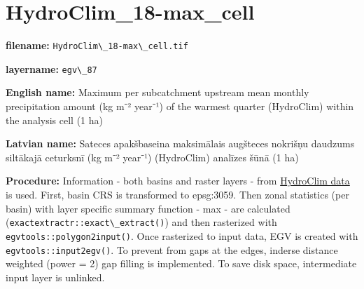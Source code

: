 \documentclass[
]{book}
\newcommand{\passthrough}[1]{#1}
\begin{document}
\section{HydroClim\_18-max\_cell}\label{ch06.087}

\textbf{filename:} \passthrough{\lstinline!HydroClim\_18-max\_cell.tif!}

\textbf{layername:} \passthrough{\lstinline!egv\_87!}

\textbf{English name:} Maximum per subcatchment upstream mean monthly precipitation amount (kg m⁻² year⁻¹) of the warmest quarter (HydroClim) within the analysis cell (1 ha)

\textbf{Latvian name:} Sateces apakšbaseina maksimālais augšteces nokrišņu daudzums siltākajā ceturksnī (kg m⁻² year⁻¹) (HydroClim) analīzes šūnā (1 ha)

\textbf{Procedure:} Information - both basins and raster layers - from \hyperref[Ch04.12]{HydroClim data}
is used. First, basin CRS is transformed to epsg:3059. Then zonal statistics (per basin) with
layer specific summary function - max - are calculated (\passthrough{\lstinline!exactextractr::exact\_extract()!})
and then rasterized with \passthrough{\lstinline!egvtools::polygon2input()!}. Once rasterized to input data,
EGV is created with \passthrough{\lstinline!egvtools::input2egv()!}. To prevent from gaps at the edges,
inderse distance weighted (power = 2) gap filling is implemented. To save disk space,
intermediate input layer is unlinked.
\end{document}
